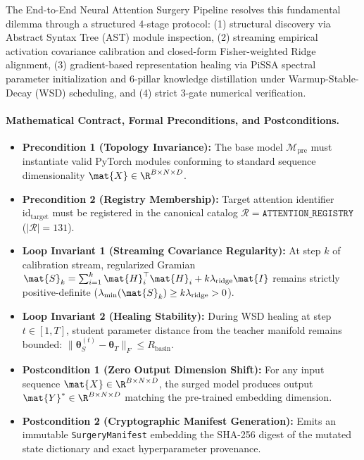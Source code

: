 The \neuralops{} End-to-End Neural Attention Surgery Pipeline resolves this fundamental dilemma through a structured 4-stage protocol: (1) structural discovery via Abstract Syntax Tree (AST) module inspection, (2) streaming empirical activation covariance calibration and closed-form Fisher-weighted Ridge alignment, (3) gradient-based representation healing via PiSSA spectral parameter initialization and 6-pillar knowledge distillation under Warmup-Stable-Decay (WSD) scheduling, and (4) strict 3-gate numerical verification.

\paragraph{Mathematical Contract, Formal Preconditions, and Postconditions.}
\begin{itemize}
    \item \textbf{Precondition 1 (Topology Invariance):} The base model $\mathcal{M}_{\text{pre}}$ must instantiate valid PyTorch modules conforming to standard sequence dimensionality $\mat{X} \in \R^{B \times N \times D}$.
    \item \textbf{Precondition 2 (Registry Membership):} Target attention identifier $\text{id}_{\text{target}}$ must be registered in the canonical catalog $\mathcal{R} = \mathtt{ATTENTION\_REGISTRY}$ ($|\mathcal{R}| = 131$).
    \item \textbf{Loop Invariant 1 (Streaming Covariance Regularity):} At step $k$ of calibration stream, regularized Gramian $\mat{S}_k = \sum_{i=1}^k \mat{H}_i^\top \mat{H}_i + k \lambda_{\text{ridge}} \mat{I}$ remains strictly positive-definite ($\lambda_{\min}(\mat{S}_k) \ge k \lambda_{\text{ridge}} > 0$).
    \item \textbf{Loop Invariant 2 (Healing Stability):} During WSD healing at step $t \in [1, T]$, student parameter distance from the teacher manifold remains bounded: $\|\bm{\theta}_S^{(t)} - \bm{\theta}_T\|_F \le R_{\text{basin}}$.
    \item \textbf{Postcondition 1 (Zero Output Dimension Shift):} For any input sequence $\mat{X} \in \R^{B \times N \times D}$, the surged model produces output $\mat{Y}^* \in \R^{B \times N \times D}$ matching the pre-trained embedding dimension.
    \item \textbf{Postcondition 2 (Cryptographic Manifest Generation):} Emits an immutable \texttt{SurgeryManifest} embedding the SHA-256 digest of the mutated state dictionary and exact hyperparameter provenance.
\end{itemize}

